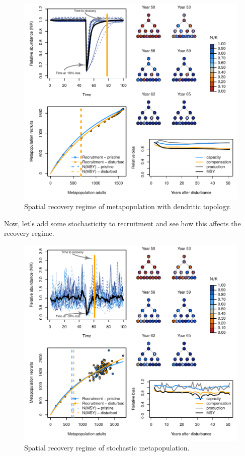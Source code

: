 \documentclass[]{article}
\begin{document}
\begin{figure}[H]

{\centering \includegraphics{Managing_for_ecological_surprises_in_metapopulations_makeHTML_files/figure-latex/example results2-1} 

}

\caption{Spatial recovery regime of metapopulation with dendritic topology.}\label{fig:example results2}
\end{figure}

Now, let's add some stochasticity to recruitment and see how this
affects the recovery regime.

\begin{figure}[H]

{\centering \includegraphics{Managing_for_ecological_surprises_in_metapopulations_makeHTML_files/figure-latex/example results3-1} 

}

\caption{Spatial recovery regime of stochastic metapopulation.}\label{fig:example results3}
\end{figure}
\end{document}
